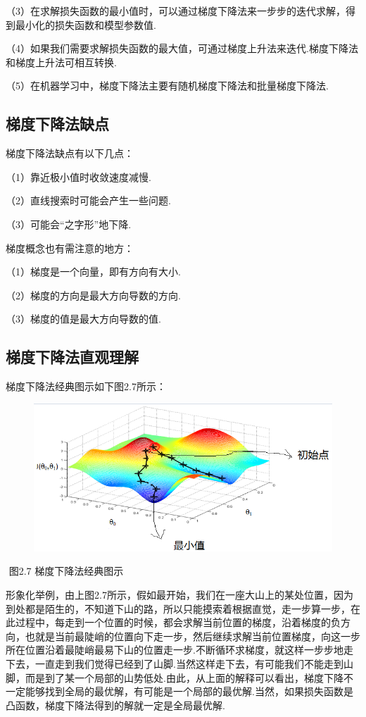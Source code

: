 （3）在求解损失函数的最小值时，可以通过梯度下降法来一步步的迭代求解，得到最小化的损失函数和模型参数值.

（4）如果我们需要求解损失函数的最大值，可通过梯度上升法来迭代.梯度下降法和梯度上升法可相互转换.

（5）在机器学习中，梯度下降法主要有随机梯度下降法和批量梯度下降法.

\subsection{梯度下降法缺点}\label{ux68afux5ea6ux4e0bux964dux6cd5ux7f3aux70b9}

梯度下降法缺点有以下几点：

（1）靠近极小值时收敛速度减慢.

（2）直线搜索时可能会产生一些问题.

（3）可能会``之字形''地下降.

梯度概念也有需注意的地方：

（1）梯度是一个向量，即有方向有大小.

（2）梯度的方向是最大方向导数的方向.

（3）梯度的值是最大方向导数的值.

\subsection{梯度下降法直观理解}\label{ux68afux5ea6ux4e0bux964dux6cd5ux76f4ux89c2ux7406ux89e3}

梯度下降法经典图示如下图2.7所示：

\begin{figure}
\centering
\includegraphics{./img/ch2/2.25/1.png}
\caption{}
\end{figure}

​ 图2.7 梯度下降法经典图示

​
形象化举例，由上图2.7所示，假如最开始，我们在一座大山上的某处位置，因为到处都是陌生的，不知道下山的路，所以只能摸索着根据直觉，走一步算一步，在此过程中，每走到一个位置的时候，都会求解当前位置的梯度，沿着梯度的负方向，也就是当前最陡峭的位置向下走一步，然后继续求解当前位置梯度，向这一步所在位置沿着最陡峭最易下山的位置走一步.不断循环求梯度，就这样一步步地走下去，一直走到我们觉得已经到了山脚.当然这样走下去，有可能我们不能走到山脚，而是到了某一个局部的山势低处.
​
由此，从上面的解释可以看出，梯度下降不一定能够找到全局的最优解，有可能是一个局部的最优解.当然，如果损失函数是凸函数，梯度下降法得到的解就一定是全局最优解.

